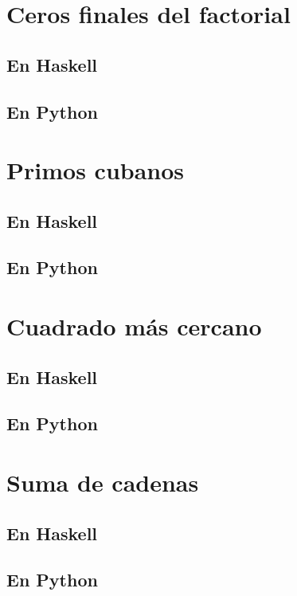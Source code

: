 \documentclass[a4paper,12pt,twoside]{book}
\begin{document}
\section{Ceros finales del factorial}
\subsection{En Haskell}
\subsection{En Python}

\section{Primos cubanos}
\subsection{En Haskell}
\subsection{En Python}

\section{Cuadrado más cercano}
\subsection{En Haskell}
\subsection{En Python}

\section{Suma de cadenas}
\subsection{En Haskell}
\subsection{En Python}
\end{document}

